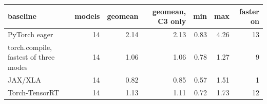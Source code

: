 \begin{tabular}{lrrrrrr}
\toprule
baseline & models & geomean & geomean, C3 only & min & max & faster on \\
\midrule
PyTorch eager & 14 & 2.14 & 2.13 & 0.83 & 4.26 & 13 \\
torch.compile, fastest of three modes & 14 & 1.06 & 1.06 & 0.78 & 1.27 & 9 \\
JAX/XLA & 14 & 0.82 & 0.85 & 0.57 & 1.51 & 1 \\
Torch-TensorRT & 14 & 1.13 & 1.11 & 0.72 & 1.73 & 12 \\
\bottomrule
\end{tabular}
